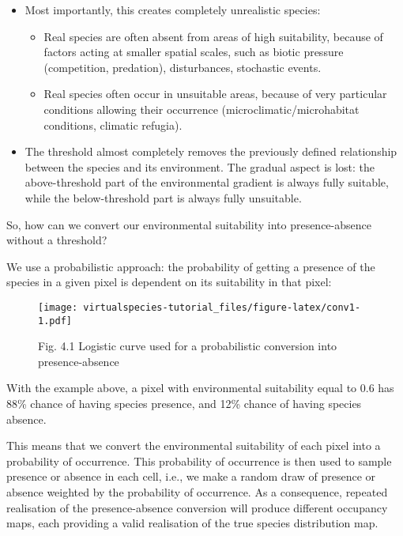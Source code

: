 \documentclass[]{article}
\providecommand{\tightlist}{%
  \setlength{\itemsep}{0pt}\setlength{\parskip}{0pt}}
\begin{document}
\begin{itemize}
\tightlist
\item
  Most importantly, this creates completely unrealistic species:

  \begin{itemize}
  \tightlist
  \item
    Real species are often absent from areas of high suitability,
    because of factors acting at smaller spatial scales, such as biotic
    pressure (competition, predation), disturbances, stochastic events.
  \item
    Real species often occur in unsuitable areas, because of very
    particular conditions allowing their occurrence
    (microclimatic/microhabitat conditions, climatic refugia).
  \end{itemize}
\item
  The threshold almost completely removes the previously defined
  relationship between the species and its environment. The gradual
  aspect is lost: the above-threshold part of the environmental gradient
  is always fully suitable, while the below-threshold part is always
  fully unsuitable.
\end{itemize}

So, how can we convert our environmental suitability into
presence-absence without a threshold?

We use a probabilistic approach: the probability of getting a presence
of the species in a given pixel is dependent on its suitability in that
pixel:

\begin{figure}
\centering
\texttt{[image: virtualspecies-tutorial\_files/figure-latex/conv1-1.pdf]}
\caption{Fig. 4.1 Logistic curve used for a probabilistic conversion
into presence-absence}
\end{figure}

With the example above, a pixel with environmental suitability equal to
0.6 has 88\% chance of having species presence, and 12\% chance of
having species absence.

This means that we convert the environmental suitability of each pixel
into a probability of occurrence. This probability of occurrence is then
used to sample presence or absence in each cell, i.e., we make a random
draw of presence or absence weighted by the probability of occurrence.
As a consequence, repeated realisation of the presence-absence
conversion will produce different occupancy maps, each providing a valid
realisation of the true species distribution map.
\end{document}
